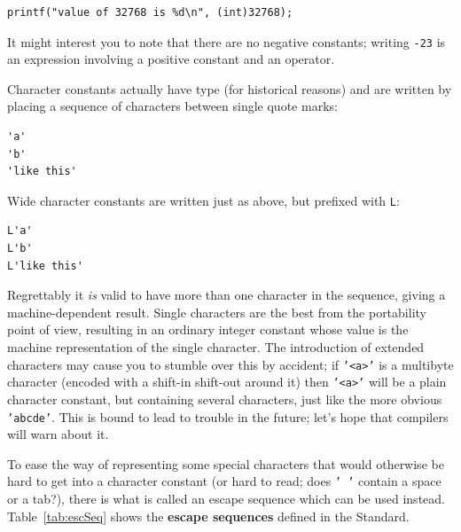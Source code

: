    \begin{Verbatim}
printf("value of 32768 is %d\n", (int)32768);
\end{Verbatim}

   It might interest you to note that there are no negative constants;
    writing \texttt{-23} is an expression involving a positive
    constant and an operator.


   Character constants actually have type \kint{} (for historical
    reasons) and are written by placing a sequence of characters between
    single quote marks:


   \begin{Verbatim}
'a'
'b'
'like this'
\end{Verbatim}

   Wide character constants are written just as above, but prefixed
    with \texttt{L}:


   \begin{Verbatim}
L'a'
L'b'
L'like this'
\end{Verbatim}

   Regrettably it \textit{is} valid to have more than one character in the
    sequence, giving a machine-dependent result. Single characters are the
    best from the portability point of view, resulting in an ordinary integer
    constant whose value is the machine representation of the single
    character. The introduction of extended characters may cause you to
    stumble over this by accident; if \texttt{'<a>'} is a
    multibyte character (encoded with a shift-in shift-out around it) then
    \texttt{'<a>'} will be a plain character constant, but
    containing several characters, just like the more obvious
    \texttt{'abcde'}. This is bound to lead to trouble in the future;
    let's hope that compilers will warn about it.


   To ease the way of representing some special characters that would
    otherwise be hard to get into a character constant (or hard to read; does
    \texttt{' '} contain a space or a tab?), there is what is called
    an escape sequence which can be used instead. Table~\ref{tab:escSeq}
    shows the \textbf{escape sequences} defined in the Standard.


